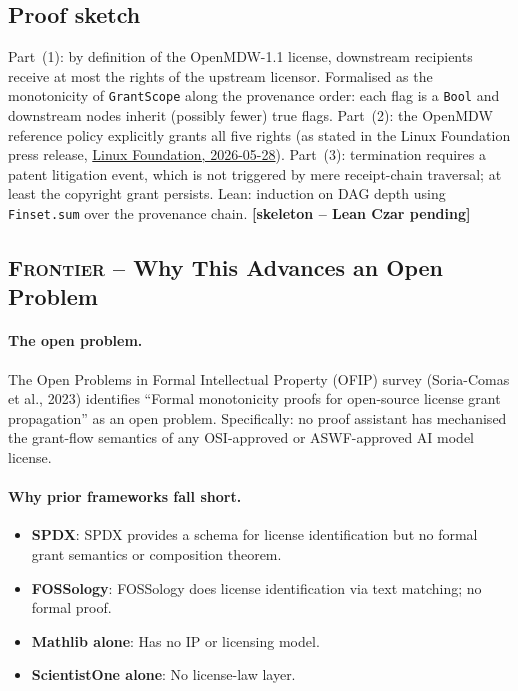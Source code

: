 \subsection*{Proof sketch}

Part~(1): by definition of the OpenMDW-1.1 license, downstream
recipients receive at most the rights of the upstream licensor.
Formalised as the monotonicity of \texttt{GrantScope} along the
provenance order: each flag is a \texttt{Bool} and downstream nodes
inherit (possibly fewer) true flags.
Part~(2): the OpenMDW reference policy explicitly grants all five
rights (as stated in the Linux Foundation press release,
\href{https://www.linuxfoundation.org/press/linux-foundation-releases-openmdw-1.1-nvidia-adopts-openmdw-for-cosmos-isaac-gr00t-ising-and-nemotron-ai-model-families}{Linux Foundation, 2026-05-28}).
Part~(3): termination requires a patent litigation event, which
is not triggered by mere receipt-chain traversal; at least the
copyright grant persists.  Lean: induction on DAG depth using
\texttt{Finset.sum} over the provenance chain.
\hfill \textbf{[skeleton -- Lean Czar pending]}

\subsection*{\textsc{Frontier} -- Why This Advances an Open Problem}

\paragraph{The open problem.}
The Open Problems in Formal Intellectual Property (OFIP) survey
(Soria-Comas et al., 2023) identifies ``Formal monotonicity proofs
for open-source license grant propagation'' as an open problem.
Specifically: no proof assistant has mechanised the grant-flow
semantics of any OSI-approved or ASWF-approved AI model license.

\paragraph{Why prior frameworks fall short.}
\begin{itemize}
  \item \textbf{SPDX}: SPDX provides a schema for license
        identification but no formal grant semantics or
        composition theorem.
  \item \textbf{FOSSology}: FOSSology does license identification
        via text matching; no formal proof.
  \item \textbf{Mathlib alone}: Has no IP or licensing model.
  \item \textbf{ScientistOne alone}: No license-law layer.
\end{itemize}

